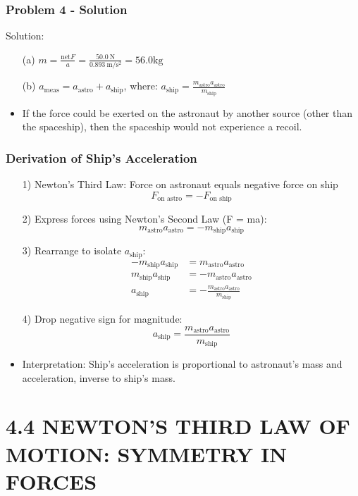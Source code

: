 \documentclass{beamer}
\begin{document}
\begin{frame}
\frametitle{Problem 4 - Solution}
Solution:
\begin{itemize}
    \item[(a)] $m = \frac{\text{net} F}{a} = \frac{50.0 \mathrm{~N}}{0.893 \mathrm{~m} / \mathrm{s}^{2}} = 56.0 \mathrm{kg}$
    \item[(b)] $a_{\text{meas}} = a_{\text{astro}} + a_{\text{ship}}$, where: $a_{\text{ship}} = \frac{m_{\text{astro}} a_{\text{astro}}}{m_{\text{ship}}}$
    \item If the force could be exerted on the astronaut by another source (other than the spaceship), then the spaceship would not experience a recoil.
\end{itemize}
\end{frame}

\begin{frame}
\frametitle{Derivation of Ship's Acceleration}
\small
\begin{itemize}
    \item[1)] Newton's Third Law: Force on astronaut equals negative force on ship
    $$F_{\text{on astro}} = -F_{\text{on ship}}$$
    
    \item[2)] Express forces using Newton's Second Law (F = ma):
    $$m_{\text{astro}} a_{\text{astro}} = -m_{\text{ship}} a_{\text{ship}}$$
    
    \item[3)] Rearrange to isolate $a_{\text{ship}}$:
    \begin{align*}
        -m_{\text{ship}} a_{\text{ship}} &= m_{\text{astro}} a_{\text{astro}} \\
        m_{\text{ship}} a_{\text{ship}} &= -m_{\text{astro}} a_{\text{astro}} \\
        a_{\text{ship}} &= -\frac{m_{\text{astro}} a_{\text{astro}}}{m_{\text{ship}}}
    \end{align*}
    
    \item[4)] Drop negative sign for magnitude:
    $$a_{\text{ship}} = \frac{m_{\text{astro}} a_{\text{astro}}}{m_{\text{ship}}}$$
    
    \item Interpretation: Ship's acceleration is proportional to astronaut's mass and acceleration, inverse to ship's mass.
\end{itemize}
\end{frame}

\section{4.4 NEWTON'S THIRD LAW OF MOTION: SYMMETRY IN FORCES}
\end{document}
